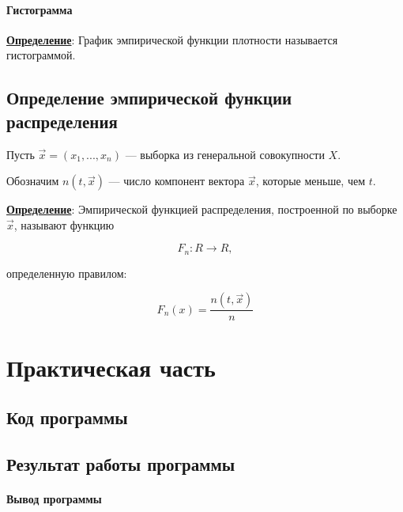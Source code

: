 \subsubsection{Гистограмма}

\textbf{\underline{Определение}}: График эмпирической функции плотности называется \linebreak гистограммой.


\section{Определение эмпирической функции распределения}

Пусть $\vec x = (x_1, ..., x_n)$ --- выборка из генеральной совокупности $X$.

Обозначим $n(t, \vec x)$ --- число компонент вектора $\vec x$, которые меньше, чем $t$.\newline

\textbf{\underline{Определение}}: Эмпирической функцией распределения, построенной по выборке $\vec x$, называют функцию

\begin{equation}
    F_n: {R} \to {R},
\end{equation}

определенную правилом:

\begin{equation}
    F_n(x) = \frac{n(t, \vec x)}{n}
\end{equation}



\chapter{Практическая часть}

\section{Код программы}




\section{Результат работы программы}

\subsubsection{Вывод программы}

